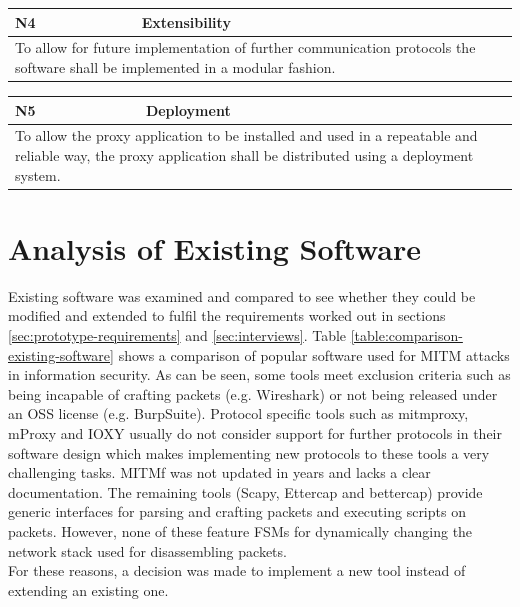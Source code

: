 \begin{center}
    \begin{tabular}{|p{1cm}|p{12cm}|}
        \hline
        \textbf{N4} & \textbf{Extensibility}                                                                                                                      \\ \hline
        \multicolumn{2}{|p{12cm}|}{To allow for future implementation of further communication protocols the software shall be implemented in a modular fashion.} \\ \hline
    \end{tabular}
\end{center}
\begin{center}
    \begin{tabular}{|p{1cm}|p{12cm}|}
        \hline
        \textbf{N5} & \textbf{Deployment}                                                                                                                                                           \\ \hline
        \multicolumn{2}{|p{12cm}|}{To allow the proxy application to be installed and used in a repeatable and reliable way, the proxy application shall be distributed using a deployment system.} \\ \hline
    \end{tabular}
\end{center}

\section{Analysis of Existing Software}
\label{sec:analysis-existing-software}
Existing software was examined and compared to see whether they could be modified and extended to fulfil the requirements worked out in sections \ref{sec:prototype-requirements} and \ref{sec:interviews}. Table \ref{table:comparison-existing-software} shows a comparison of popular software used for \ac{MITM} attacks in information security. As can be seen, some tools meet exclusion criteria such as being incapable of crafting packets (e.g. Wireshark) or not being released under an \ac{OSS} license (e.g. BurpSuite). Protocol specific tools such as mitmproxy, mProxy and IOXY usually do not consider support for further protocols in their software design which makes implementing new protocols to these tools a very challenging tasks. MITMf was not updated in years and lacks a clear documentation. The remaining tools (Scapy, Ettercap and bettercap) provide generic interfaces for parsing and crafting packets and executing scripts on packets. However, none of these feature \acp{FSM} for dynamically changing the network stack used for disassembling packets.\\
For these reasons, a decision was made to implement a new tool instead of extending an existing one.

